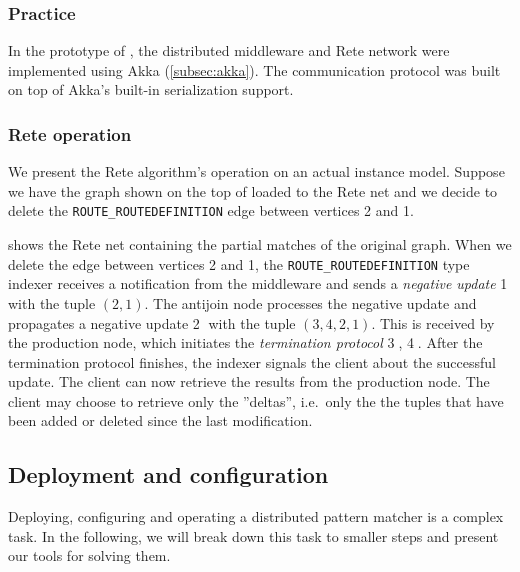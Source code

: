 \subsubsection{Practice}

In the prototype of \iqd{}, the distributed middleware and Rete network were implemented using Akka (\autoref{subsec:akka}). The communication protocol was built on top of Akka's built-in serialization support.


\subsubsection{Rete operation}

We present the Rete algorithm's operation on an actual instance model. Suppose we have the graph shown on the top of  loaded to the Rete net and we decide to delete the \texttt{ROUTE\_ROUTEDEFINITION} edge between vertices 2 and 1.


 shows the Rete net containing the partial matches of the original graph. When we delete the edge between vertices 2 and 1, the \texttt{ROUTE\_ROUTEDEFINITION} type indexer receives a notification from the middleware and sends a \textit{negative update} \textcircled{1} with the tuple $(2, 1)$. The antijoin node processes the negative update and propagates a negative update \textcircled{2} with the tuple $(3, 4, 2, 1)$. This is received by the production node, which initiates the \textit{termination protocol} \textcircled{3}, \textcircled{4}. After the termination protocol finishes, the indexer signals the client about the successful update. The client can now retrieve the results from the production node. The client may choose to retrieve only the ''deltas'', i.e.\ only the the tuples that have been added or deleted since the last modification.





\subsection{Deployment and configuration}
\label{subsec:deployment-configuration}

Deploying, configuring and operating a distributed pattern matcher is a complex task. In the following, we will break down this task to smaller steps and present our tools for solving them. 

